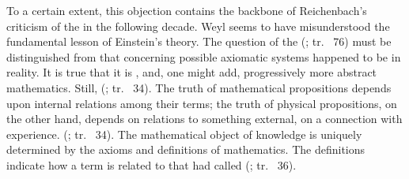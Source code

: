 \documentclass[draft]{article}
\newcommand{\rhp}[2]{(\cite[#1]{Reichenbach1920a}; tr.\ \citeyear{Reichenbach1969} #2)\xspace}
\begin{document}
%
To a certain extent, this objection contains the backbone of Reichenbach's criticism of the \uftp in the following decade. Weyl seems to have misunderstood the fundamental lesson of Einstein's theory. The question of the  \rhp{73}{76} must be distinguished from that concerning possible axiomatic systems happened to be in reality. It is true that it is , and, one might add, progressively more abstract mathematics. Still,  \rhp{33}{34}. The truth of mathematical propositions depends upon internal relations among their terms; the truth of physical propositions, on the other hand, depends on relations to something external, on a connection with experience.  \rhp{33}{34}. The mathematical object of knowledge is uniquely determined by the axioms and definitions of mathematics. The definitions indicate how a term is related to that \citet{Schlick1918} had called  \rhp{33}{36}. 
\end{document}
